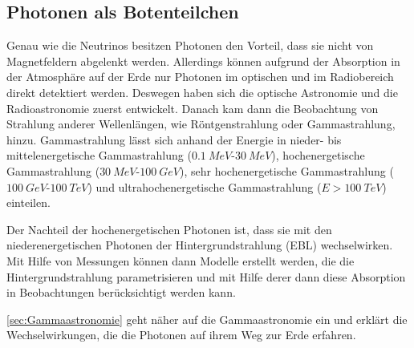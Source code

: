 

\subsection{Photonen als Botenteilchen}
\label{subsec:Photonen}
Genau wie die Neutrinos besitzen Photonen den Vorteil, dass sie nicht von Magnetfeldern abgelenkt werden.
Allerdings können aufgrund der Absorption in der Atmosphäre auf der Erde nur Photonen im optischen und im Radiobereich direkt detektiert werden.
Deswegen haben sich die optische Astronomie und die Radioastronomie zuerst entwickelt. 
Danach kam dann die Beobachtung von Strahlung anderer Wellenlängen, wie Röntgenstrahlung oder Gammastrahlung, hinzu.
Gammastrahlung lässt sich anhand der Energie in nieder- bis mittelenergetische Gammastrahlung ($\SI{0,1}{MeV}$-$\SI{30}{MeV}$), hochenergetische Gammastrahlung ($\SI{30}{MeV}$-$\SI{100}{GeV}$), sehr hochenergetische Gammastrahlung ($\SI{100}{GeV}$-$\SI{100}{TeV}$) und ultrahochenergetische Gammastrahlung ($E>\SI{100}{TeV}$) einteilen.\cite{Weekes}


Der Nachteil der hochenergetischen Photonen ist, dass sie mit den niederenergetischen Photonen der Hintergrundstrahlung (EBL) wechselwirken.
Mit Hilfe von Messungen können dann Modelle erstellt werden, die die Hintergrundstrahlung parametrisieren und mit Hilfe derer dann diese Absorption in Beobachtungen berücksichtigt werden kann.


\autoref{sec:Gammaastronomie} geht näher auf die Gammaastronomie ein und erklärt die Wechselwirkungen, die die Photonen auf ihrem Weg zur Erde erfahren.


